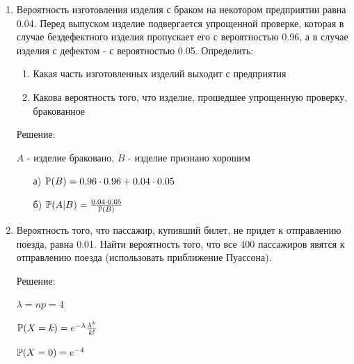 \documentclass[12pt, a4paper]{article}\usepackage[]{graphicx}\usepackage[]{color}
\begin{document}
\begin{enumerate}
\item Вероятность изготовления изделия с браком на некотором
предприятии равна 0.04. Перед выпуском изделие подвергается
упрощенной проверке, которая в случае бездефектного изделия
пропускает его с вероятностью 0.96, а в случае изделия с дефектом
- с вероятностью 0.05. Определить:
\begin{enumerate}
\item Какая часть изготовленных изделий выходит с предприятия
\item Какова вероятность того, что изделие, прошедшее упрощенную
проверку, бракованное
\end{enumerate}
Решение:

$A$ - изделие браковано, $B$ - изделие признано хорошим
\begin{enumerate}
\item[а)] $\P(B)=0.96\cdot 0.96+0.04\cdot 0.05$
\item[б)] $\P(A|B)=\frac{0.04\cdot 0.05}{\P(B)}$
\end{enumerate}
\item  Вероятность того, что пассажир, купивший билет, не придет к
отправлению поезда, равна 0.01. Найти вероятность того, что все
400 пассажиров явятся к отправлению поезда (использовать
приближение Пуассона).

Решение:

$\lambda=np=4$

$\P(X=k)=e^{-\lambda}\frac{\lambda^{k}}{k!}$

$\P(X=0)=e^{-4}$


\end{enumerate}
\end{document}
